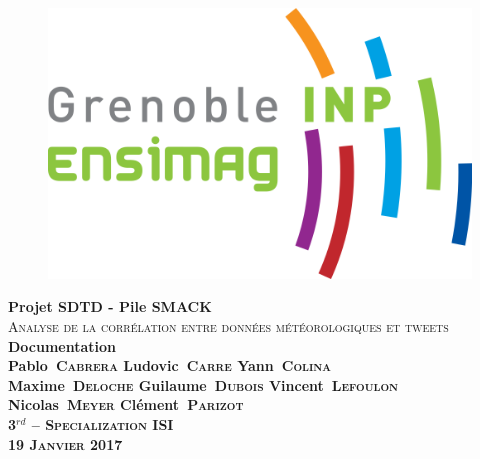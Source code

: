 \documentclass[12pt]{article}
\begin{document}
\begin{titlepage}
\center 
\begin{figure}[!tbp]
  \centering
  \begin{minipage}[b]{0.4\textwidth}
    \includegraphics[width=\textwidth]{ensimag.png}
    \vspace{3cm}
  \end{minipage}
\end{figure}
{\huge \bfseries Projet SDTD - Pile SMACK}\\[2cm]

\Large \textsc{Analyse de la corrélation  entre données météorologiques  et tweets}\\[2cm]
\huge \bfseries Documentation\\[2cm]
\large Pablo\ \textsc{Cabrera} \hspace{0.5cm}
Ludovic\ \textsc{Carre} \hspace{0.5cm}
Yann\ \textsc{Colina}\\
Maxime\ \textsc{Deloche}\hspace{0.5cm} 
Guilaume\ \textsc{Dubois}\hspace{0.5cm} 
Vincent\ \textsc{Lefoulon}\\ 
Nicolas\ \textsc{Meyer}\hspace{0.5cm} 
Clément\ \textsc{Parizot} \\ \vspace{1cm}
\textsc{3$^{rd}$ – Specialization ISI} \\ \vspace{1cm}
\textsc{19 Janvier 2017}

\thispagestyle{fancy}
\vfill %

\end{titlepage}
\fancyfoot[LE,RO]{\normalsize \thepage}
\end{document}
